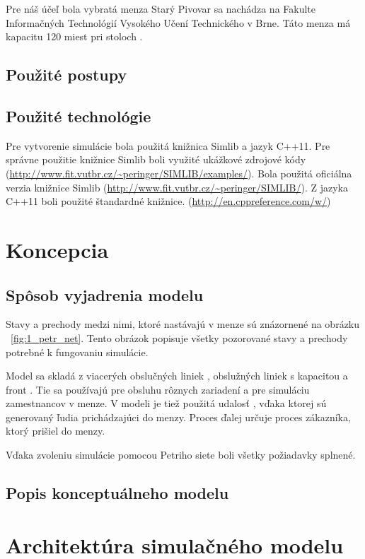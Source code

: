 \documentclass{article}
\begin{document}
Pre náš účeľ bola vybratá menza Starý Pivovar sa nachádza na Fakulte Informačných Technológií Vysokého Učení Technického v Brne. Táto menza má kapacitu 120 miest pri stoloch \cite{menzy}. 

\subsection{Použité postupy}
\subsection{Použité technológie}
Pre vytvorenie simulácie bola použitá knižnica Simlib a jazyk C++11. Pre správne použitie knižnice Simlib boli využité ukážkové zdrojové kódy (\url{http://www.fit.vutbr.cz/~peringer/SIMLIB/examples/}). Bola použitá oficiálna verzia knižnice Simlib (\url{http://www.fit.vutbr.cz/~peringer/SIMLIB/}). Z jazyka C++11 boli použité štandardné knižnice. (\url{http://en.cppreference.com/w/})

\section{Koncepcia}


\subsection{Spôsob vyjadrenia modelu}
Stavy a prechody medzi nimi, ktoré nastávajú v menze sú znázornené na obrázku ~\ref{fig:1_petr_net}. Tento obrázok popisuje všetky pozorované stavy a prechody potrebné k fungovaniu simulácie.

Model sa skladá z viacerých obslučných liniek \cite[str. 163]{ims}, obslužných liniek s kapacitou \cite[str. 163]{ims} a front \cite[str. 163]{ims}. Tie sa používajú pre obsluhu rôznych zariadení a pre simuláciu zamestnancov v menze. V modeli je tiež použitá udalosť \cite[str. 163]{ims}, vďaka ktorej sú generovaný ľudia prichádzajúci do menzy. Proces \cite[str. 163]{ims} ďalej určuje proces zákazníka, ktorý prišiel do menzy.

Vďaka zvoleniu simulácie pomocou Petriho siete boli všetky požiadavky splnené.

\subsection{Popis konceptuálneho modelu}

\section{Architektúra simulačného modelu}
\end{document}
